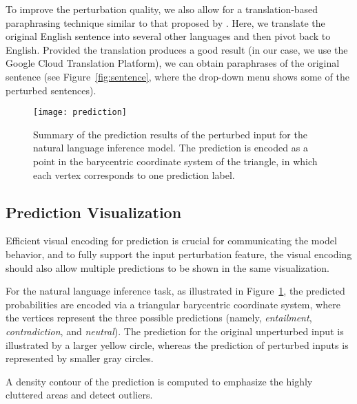 To improve the perturbation quality, we also allow for a translation-based paraphrasing technique similar to that proposed by \citet{mallinson2017paraphrasing}. Here, we translate the original English sentence into several other languages and then pivot back to English. Provided the translation produces a good result (in our case, we use the Google Cloud Translation Platform), we can obtain paraphrases of the original sentence (see Figure~\ref{fig:sentence}, where the drop-down menu shows some of the perturbed sentences).

\begin{figure}[htbp]
\centering
 \texttt{[image: prediction]}
 \caption{
Summary of the prediction results of the perturbed input for the natural language inference model.
The prediction is encoded as a point in the barycentric coordinate system of the triangle, in which each vertex corresponds to one prediction label.
}
\vspace{-3mm}
\label{fig:prediction}
\end{figure}

\subsection{Prediction Visualization}
Efficient visual encoding for prediction is crucial for communicating the model behavior, and to fully support the input perturbation feature, the visual encoding should also allow multiple predictions to be shown in the same visualization.
%

For the natural language inference task, as illustrated in Figure~\ref{fig:prediction}, the predicted probabilities are encoded via a triangular barycentric coordinate system, where the vertices represent the three possible predictions (namely, \emph{entailment}, \emph{contradiction}, and \emph{neutral}). The prediction for the original unperturbed input is illustrated by a larger yellow circle, whereas the prediction of perturbed inputs is represented by smaller gray circles.

A density contour of the prediction is computed to emphasize the highly cluttered areas and detect outliers.

